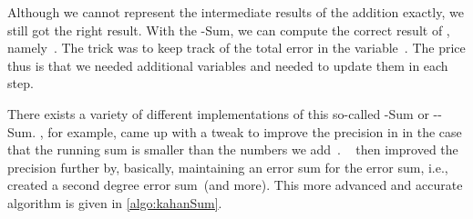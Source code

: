 %
Although we cannot represent the intermediate results of the addition exactly, we still got the right result.
With the \citeauthor{K1965PFRORTE}-Sum, we can compute the correct result of , namely~.
The trick was to keep track of the total error in the variable~.
The price thus is that we needed additional variables and needed to update them in each step.%
%
\FloatBarrier%
%

There exists a variety of different implementations of this so-called \citeauthor{K1965PFRORTE}-Sum or \citeauthor{K1965PFRORTE}-\citeauthor{B1968NSIMA}-Sum.
, for example, came up with a tweak to improve the precision in \citeyear{N1974REVZSES} in the case that the running sum is smaller than the numbers we add~\cite{N1974REVZSES}.
~\cite{K2006AGKBSA} then improved the precision further by, basically, maintaining an error sum for the error sum, i.e., created a second degree error sum~(and more).
This more advanced and accurate algorithm is given in \cref{algo:kahanSum}.


